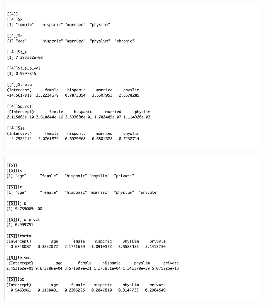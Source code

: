 \documentclass[12pt]{article}
\begin{document}
\includegraphics{4.png}

\includegraphics{5.png}



\newpage
\end{document}
